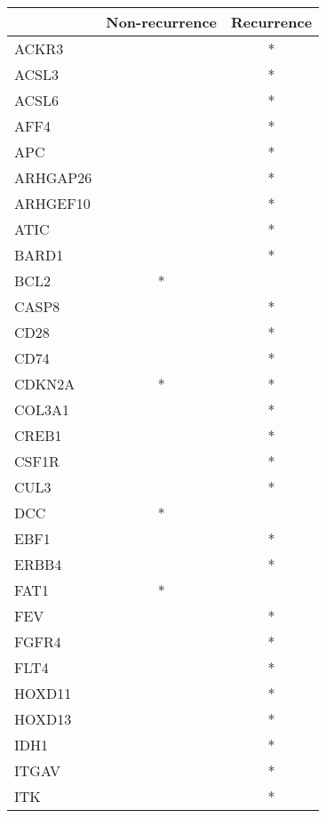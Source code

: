 \begin{tabular}{lcc}
\toprule
{} & Non-recurrence & Recurrence \\
\midrule
ACKR3    &                &          * \\
ACSL3    &                &          * \\
ACSL6    &                &          * \\
AFF4     &                &          * \\
APC      &                &          * \\
ARHGAP26 &                &          * \\
ARHGEF10 &                &          * \\
ATIC     &                &          * \\
BARD1    &                &          * \\
BCL2     &              * &            \\
CASP8    &                &          * \\
CD28     &                &          * \\
CD74     &                &          * \\
CDKN2A   &              * &          * \\
COL3A1   &                &          * \\
CREB1    &                &          * \\
CSF1R    &                &          * \\
CUL3     &                &          * \\
DCC      &              * &            \\
EBF1     &                &          * \\
ERBB4    &                &          * \\
FAT1     &              * &            \\
FEV      &                &          * \\
FGFR4    &                &          * \\
FLT4     &                &          * \\
HOXD11   &                &          * \\
HOXD13   &                &          * \\
IDH1     &                &          * \\
ITGAV    &                &          * \\
ITK      &                &          * \\

\end{tabular}
